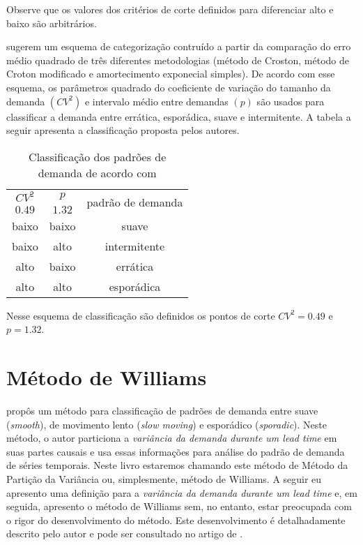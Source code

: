 \documentclass{book}
\begin{document}
Observe que os valores dos critérios de corte definidos para diferenciar alto e baixo são arbitrários.

\cite{SyntetosEtAl2005} sugerem um esquema de categorização contruído a partir da comparação do erro médio quadrado de três diferentes metodologias (método de Croston, método de Croton modificado e amortecimento exponecial simples). De acordo com esse esquema, os parâmetros quadrado do coeficiente de variação do tamanho da demanda $(CV^2)$ e intervalo médio entre demandas $(p)$ são usados para classificar a demanda entre errática, esporádica, suave e intermitente. A tabela a seguir apresenta a classificação proposta pelos autores.

\begin{table}[h]
\begin{center}
\begin{tabular}[c]{c c c}
\cline {1-3}
$CV^2$ & $p$ & \multirow{2}{*}{padrão de demanda} \\ 
$0.49$ & $1.32$ & \\ \cline {1-3}
baixo & baixo & suave   \\ 
baixo & alto  & intermitente   \\ 
alto  & baixo & errática   \\
alto  & alto  & esporádica  \\ \cline {1-3}
\end{tabular}
\caption{Classificação dos padrões de demanda de acordo com \cite{SyntetosEtAl2005}}
\label{tab:DemandPatternSybtetos}
\end{center}
\end{table}

Nesse esquema de classificação são definidos os pontos de corte $CV^2=0.49$ e $p=1.32$.

\section{Método de Williams}
\label{sec:williams}

\cite{Williams1984} propôs um método para classificação de padrões de demanda entre suave (\emph{smooth}), de movimento lento (\emph{slow moving}) e esporádico (\emph{sporadic}). Neste método, o autor particiona a \emph{variância da demanda durante um lead time} em suas partes causais e usa essas informações para análise do padrão de demanda de séries temporais. Neste livro estaremos chamando este método de Método da Partição da Variância ou, simplesmente, método de Williams. A seguir eu apresento uma definição para a \emph{variância da demanda durante um lead time} e, em seguida, apresento o método de Williams sem, no entanto, estar preocupada com o rigor do desenvolvimento do método. Este desenvolvimento é detalhadamente descrito pelo autor e pode ser consultado no artigo de \cite{Williams1984}.
\end{document}
